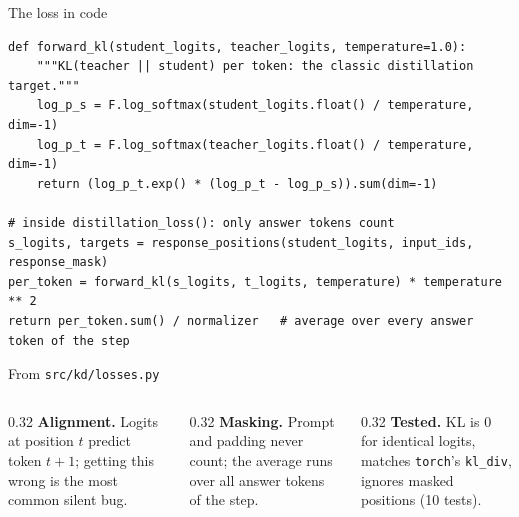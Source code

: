 \begin{frame}[fragile]{The loss in code\hfill{}}
\begin{lstlisting}
def forward_kl(student_logits, teacher_logits, temperature=1.0):
    """KL(teacher || student) per token: the classic distillation target."""
    log_p_s = F.log_softmax(student_logits.float() / temperature, dim=-1)
    log_p_t = F.log_softmax(teacher_logits.float() / temperature, dim=-1)
    return (log_p_t.exp() * (log_p_t - log_p_s)).sum(dim=-1)

# inside distillation_loss(): only answer tokens count
s_logits, targets = response_positions(student_logits, input_ids, response_mask)
per_token = forward_kl(s_logits, t_logits, temperature) * temperature ** 2
return per_token.sum() / normalizer   # average over every answer token of the step
\end{lstlisting}
  {\tiny\color{kdgray} From \texttt{src/kd/losses.py}}
  \vspace{0.1cm}

  \begin{columns}[T]
    \begin{column}{0.32\textwidth}
      \footnotesize\textbf{Alignment.} Logits at position $t$ predict token
      $t+1$; getting this wrong is the most common silent bug.
    \end{column}
    \begin{column}{0.32\textwidth}
      \footnotesize\textbf{Masking.} Prompt and padding never count; the
      average runs over all answer tokens of the step.
    \end{column}
    \begin{column}{0.32\textwidth}
      \footnotesize\textbf{Tested.} KL is 0 for identical logits, matches
      \texttt{torch}'s \texttt{kl\_div}, ignores masked positions
      (10 tests).
    \end{column}
  \end{columns}
\end{frame}
